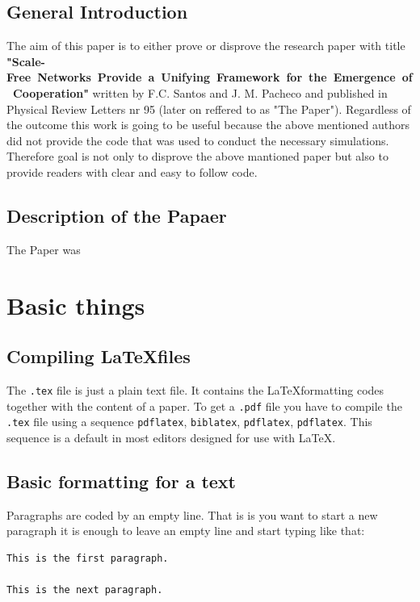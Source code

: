 \documentclass[english, twoside, 12pt, a4paper]{article}
\theoremstyle{definition}
\theoremstyle{plain}
\theoremstyle{remark}
\begin{document}
\subsection{General Introduction}

The aim of this paper is to either prove or disprove the research paper with title \mbox{\textbf{"Scale-Free Networks Provide a Unifying Framework for the Emergence of Cooperation"}}
 written by F.C. Santos and J. M. Pacheco and published in Physical Review Letters nr 95 (later on reffered to as "The Paper"). Regardless of the outcome this work is going to be useful
 because the above mentioned authors did not provide the code that was used to conduct the necessary simulations. Therefore goal is not only
 to disprove the above mantioned paper but also to provide readers with clear and easy to follow code. 

 \subsection{Description of the Papaer}

The Paper was 

\clearpage
\section{Basic things}

\subsection{Compiling \LaTeX files}

The \verb+.tex+ file is just a plain text file. It contains the \LaTeX formatting codes together with the content of a paper. To get a \verb+.pdf+ file you have to compile the \verb+.tex+ file using a sequence \verb+pdflatex+, \verb+biblatex+, \verb+pdflatex+, \verb+pdflatex+. This sequence is a default in most editors designed for use with \LaTeX.

\subsection{Basic formatting for a text}

Paragraphs are coded by an empty line. That is is you want to start a new paragraph it is enough to leave an empty line and start typing like that:
\begin{verbatim}
This is the first paragraph.

This is the next paragraph.
\end{verbatim}
\end{document}
